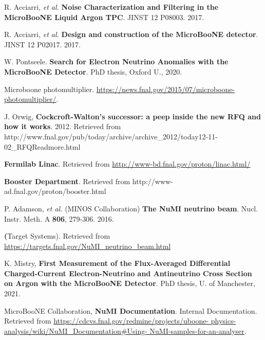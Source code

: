  R. Acciarri, \textit{et al.} \textbf{Noise Characterization and Filtering in the MicroBooNE Liquid Argon TPC}. JINST 12 P08003. 2017.

 R. Acciarri, \textit{et al.} \textbf{Design and construction of the MicroBooNE detector}. JINST 12 P02017. 2017. 

 W. Pontseele. \textbf{Search for Electron Neutrino Anomalies with the MicroBooNE Detector}. PhD thesis, Oxford U., 2020.

 Microboone photomultiplier. \href{https://news.fnal.gov/2015/07/microboone- photomultiplier/}{https://news.fnal.gov/2015/07/microboone- photomultiplier/}.

 J. Orwig, \textbf{Cockcroft-Walton's successor: a peep inside the new RFQ and how it works}. 2012. Retrieved from http://www.fnal.gov/pub/today/archive/archive\_2012/today12-11-02\_RFQReadmore.html

 \textbf{Fermilab Linac}. Retrieved from \url{http://www-bd.fnal.gov/proton/linac.html/}

 \textbf{Booster Department}. Retrieved from http://www-ad.fnal.gov/proton/booster.html

 P. Adamson, \textit{et al.} (MINOS Collaboration) \textbf{The NuMI neutrino beam}. Nucl. Instr. Meth. A \textbf{806}, 279-306. 2016.

 \textbf(Target Systems). Retrieved from \url{https://targets.fnal.gov/NuMI_neutrino_beam.html}

 K. Mistry, \textbf{First Measurement of the Flux-Averaged Differential Charged-Current Electron-Neutrino and Antineutrino Cross Section on Argon with the MicroBooNE Detector}. PhD thesis, U. of Manchester, 2021. 

 MicroBooNE Collaboration, \textbf{NuMI Documentation}. Internal Documentation. Retrieved from \url{https://cdcvs.fnal.gov/redmine/projects/uboone- physics-analysis/wiki/NuMI_Documentation#Using- NuMI-samples-for-an-analyser}. 